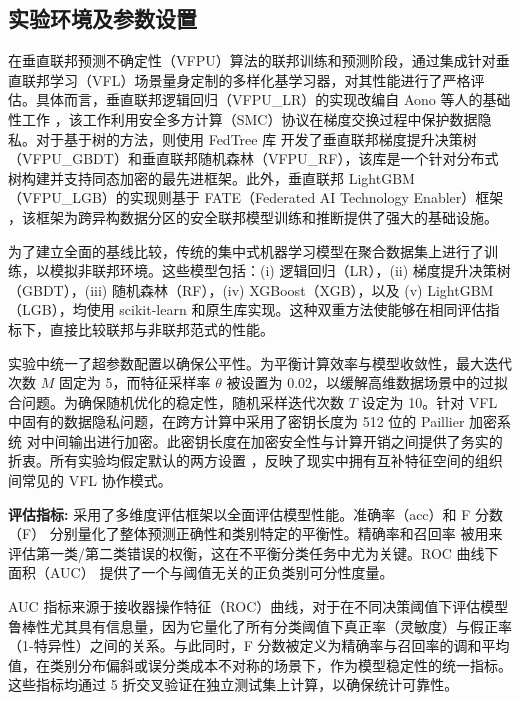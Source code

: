 \subsection{实验环境及参数设置}
在垂直联邦预测不确定性（VFPU）算法的联邦训练和预测阶段，通过集成针对垂直联邦学习（VFL）场景量身定制的多样化基学习器，对其性能进行了严格评估。具体而言，垂直联邦逻辑回归（VFPU\_LR）的实现改编自 Aono 等人的基础性工作 \citep{aono2016scalable}，该工作利用安全多方计算（SMC）协议在梯度交换过程中保护数据隐私。对于基于树的方法，则使用 FedTree 库 \citep{li2022fedtree} 开发了垂直联邦梯度提升决策树（VFPU\_GBDT）和垂直联邦随机森林（VFPU\_RF），该库是一个针对分布式树构建并支持同态加密的最先进框架。此外，垂直联邦 LightGBM（VFPU\_LGB）的实现则基于 FATE（Federated AI Technology Enabler）框架 \citep{liu2021fate}，该框架为跨异构数据分区的安全联邦模型训练和推断提供了强大的基础设施。  

为了建立全面的基线比较，传统的集中式机器学习模型在聚合数据集上进行了训练，以模拟非联邦环境。这些模型包括：(i) 逻辑回归（LR），(ii) 梯度提升决策树（GBDT），(iii) 随机森林（RF），(iv) XGBoost（XGB）\citep{chen2015xgboost}，以及 (v) LightGBM（LGB）\citep{ke2017lightgbm}，均使用 scikit-learn \citep{pedregosa2011scikit} 和原生库实现。这种双重方法使能够在相同评估指标下，直接比较联邦与非联邦范式的性能。  

实验中统一了超参数配置以确保公平性。为平衡计算效率与模型收敛性，最大迭代次数 $ M $ 固定为 5，而特征采样率 $ \theta $ 被设置为 0.02，以缓解高维数据场景中的过拟合问题。为确保随机优化的稳定性，随机采样迭代次数 $ T $ 设定为 10。针对 VFL 中固有的数据隐私问题，在跨方计算中采用了密钥长度为 512 位的 Paillier 加密系统 \citep{paillier1999public} 对中间输出进行加密。此密钥长度在加密安全性与计算开销之间提供了务实的折衷。所有实验均假定默认的两方设置 \citep{li2022fedtree}，反映了现实中拥有互补特征空间的组织间常见的 VFL 协作模式。  

\textbf{评估指标:}  
采用了多维度评估框架以全面评估模型性能。准确率（acc）和 F 分数（F）\citep{cheng2021secureboost} 分别量化了整体预测正确性和类别特定的平衡性。精确率和召回率 \citep{liu2003building} 被用来评估第一类/第二类错误的权衡，这在不平衡分类任务中尤为关键。ROC 曲线下面积（AUC）\citep{cheng2021secureboost} 提供了一个与阈值无关的正负类别可分性度量。  

AUC 指标来源于接收器操作特征（ROC）曲线，对于在不同决策阈值下评估模型鲁棒性尤其具有信息量，因为它量化了所有分类阈值下真正率（灵敏度）与假正率（1-特异性）之间的关系。与此同时，F 分数被定义为精确率与召回率的调和平均值，在类别分布偏斜或误分类成本不对称的场景下，作为模型稳定性的统一指标。这些指标均通过 5 折交叉验证在独立测试集上计算，以确保统计可靠性。  
